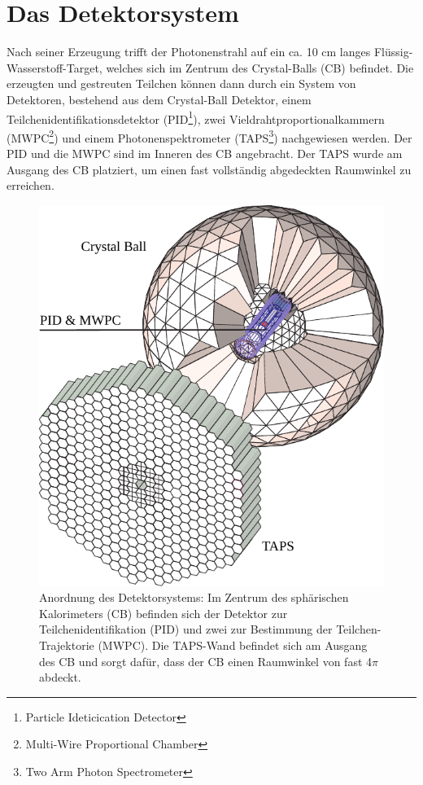 \documentclass[a4paper,11pt,oneside,final,german,openbib,pdftex]{scrbook}
\begin{document}
{\section{Das Detektorsystem}
\label{sec:Das-Detektorsystem}
Nach seiner Erzeugung trifft der Photonenstrahl auf ein ca. 10 cm langes Flüssig-Wasserstoff-Target, welches sich im Zentrum des Crystal-Balls (CB) befindet. Die erzeugten und gestreuten Teilchen können dann durch ein System von Detektoren, bestehend aus dem Crystal-Ball Detektor, einem Teilchenidentifikationsdetektor (PID\footnote{Particle Ideticication Detector}), zwei Vieldrahtproportionalkammern (MWPC\footnote{Multi-Wire Proportional Chamber}) und einem Photonenspektrometer (TAPS\footnote{Two Arm  Photon Spectrometer}) nachgewiesen werden. Der PID und die MWPC sind im Inneren des CB angebracht. Der TAPS wurde am Ausgang des CB platziert, um einen fast vollständig abgedeckten Raumwinkel zu erreichen.
\begin{figure}[h!]
	\begin{center}
		\includegraphics{crystal_ball}
	
		\caption[Anordnung des Detektorsystems] {Anordnung des Detektorsystems: Im Zentrum des sph\"arischen Kalorimeters (CB) befinden sich der Detektor zur Teilchenidentifikation (PID) und zwei zur Bestimmung der Teilchen-Trajektorie (MWPC). Die TAPS-Wand befindet sich am Ausgang des CB und sorgt daf\"ur, dass der CB einen Raumwinkel von fast 4$\pi$ abdeckt.\cite{We13}}
		\label{[fig.crystal_ball]}	
\end{center}
\end{figure}

}
\end{document}
